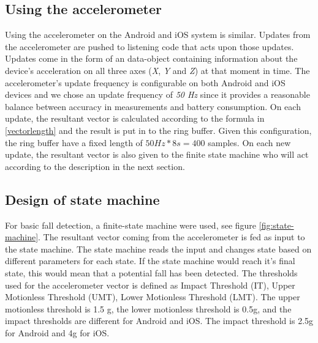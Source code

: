 \documentclass[12pt, a4paper, onecolumn]{article}
\begin{document}
	\subsection{Using the accelerometer}
	Using the accelerometer on the Android and iOS system is similar. Updates from the accelerometer are pushed to listening code that acts upon those updates. Updates come in the form of an data-object containing information about the device's acceleration on all three axes (\textit{X}, \textit{Y} and \textit{Z}) at that moment in time. The accelerometer's update frequency is configurable on both Android and iOS devices and we chose an update frequency of \textit{50 Hz} since it provides a reasonable balance between accuracy in measurements and battery consumption. On each update, the resultant vector is calculated according to the formula in \ref{vectorlength} and the result is put in to the ring buffer. Given this configuration, the ring buffer have a fixed length of \(50 Hz * 8s = 400\) samples. On each new update, the resultant vector is also given to the finite state machine who will act according to the description in the next section.
	
	
	
	\subsection{Design of state machine}
	
	For basic fall detection, a finite-state machine were used, see figure \ref{fig:state-machine}. The resultant vector coming from the accelerometer is fed as input to the state machine. The state machine reads the input and changes state based on different parameters for each state. If the state machine would reach it's final state, this would mean that a potential fall has been detected. The thresholds used for the accelerometer vector is defined as Impact Threshold (IT), Upper Motionless Threshold (UMT), Lower Motionless Threshold (LMT). The upper motionless threshold is 1.5 g, the lower motionless threshold is 0.5g, and the impact thresholds are different for Android and iOS. The impact threshold is 2.5g for Android and 4g for iOS. 
	
\end{document}
